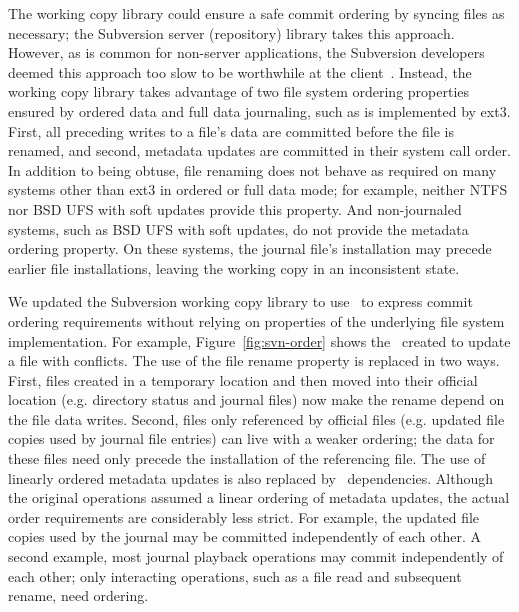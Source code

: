 The working copy library could ensure a safe commit ordering by
syncing files as necessary; the Subversion server (repository) library
takes this approach.
%
However, as is common for non-server applications, the Subversion
developers deemed this approach too slow to be worthwhile at the
client~\cite{svntradeoff}.
%
Instead, the working copy library takes advantage of two file system
ordering properties ensured by ordered data and full data journaling, such
as is implemented by ext3.
%
First, all preceding writes to a file's data are committed before the file
is renamed,
%
and second, metadata updates are committed in their system call order.
%
%
In addition to being obtuse, file renaming does not behave
as required on many systems other than ext3 in ordered or full data
mode; for example, neither NTFS nor BSD UFS with soft updates provide
this property.
%
And non-journaled systems, such as BSD UFS with soft updates, do not
provide the metadata ordering property. On these systems, the journal
file's installation may precede earlier file installations, leaving the
working copy in an inconsistent state.

We updated the Subversion working copy library to use \opgroups\ to
express commit ordering requirements
without relying on properties of the
underlying file system implementation.
%
For example, Figure~\ref{fig:svn-order} shows the \opgroups\ created to update a
file with conflicts.
%
The use of the file rename property is replaced in two ways.
%
First, files created in a temporary location and then moved into their
official location (e.g. directory status and journal files) now
make the rename depend on the file data writes.
%
Second, files only referenced by official files (e.g. updated file
copies used by journal file entries) can live with a weaker ordering;
the data for these files need only precede the installation of the
referencing file.
%
The use of linearly ordered metadata updates is also replaced by
\opgroup\ dependencies.
%
Although the original operations assumed a linear ordering of metadata
updates, the actual order requirements are considerably less strict.
%
For example, the updated file copies used by the journal may be
committed independently of each other.
%
A second example, most journal playback operations may commit
independently of each other; only interacting operations, such as a
file read and subsequent rename, need ordering.

